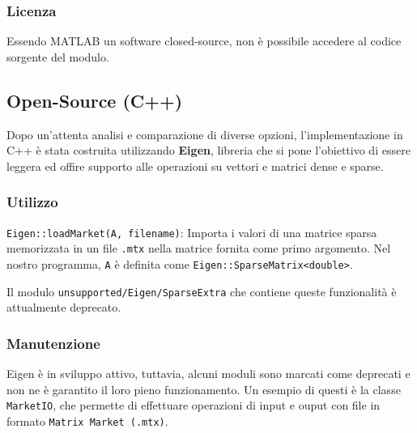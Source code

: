 \documentclass[11pt,italian]{article}
\begin{document}
\subsubsection*{Licenza}
Essendo MATLAB un software closed-source, non è possibile accedere al codice sorgente del modulo.

\subsection{Open-Source (C++)}
Dopo un'attenta analisi e comparazione di diverse opzioni, l'implementazione in C++ è stata costruita utilizzando \textbf{Eigen},  libreria che si pone l'obiettivo di essere leggera ed offire supporto alle operazioni su vettori e matrici dense e sparse.

\subsubsection*{Utilizzo}
\lstinline{Eigen::loadMarket(A, filename)}: Importa i valori di una matrice sparsa memorizzata in un file \lstinline{.mtx} nella matrice fornita come primo argomento. Nel nostro programma, \lstinline{A} è definita come \lstinline{Eigen::SparseMatrix<double>}.

Il modulo \lstinline{unsupported/Eigen/SparseExtra} che contiene queste funzionalità è attualmente deprecato.


\subsubsection{Manutenzione}
Eigen è in sviluppo attivo, tuttavia, alcuni moduli sono marcati come deprecati e non ne è garantito il loro pieno funzionamento. Un esempio di questi è la classe \lstinline{MarketIO}, che permette di effettuare operazioni di input e ouput con file in formato \lstinline{Matrix Market (.mtx)}.
\end{document}

